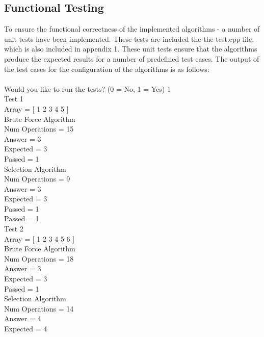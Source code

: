 \documentclass{article}
\newcommand\tab[1][1cm]{\hspace*{#1}}
\begin{document}
    \subsection{Functional Testing}
        To ensure the functional correctness of the implemented algorithms - a number of unit tests have been implemented. These tests are included the the test.cpp file, which is also included in appendix 1. These unit tests ensure that the algorithms produce the expected results for a number of predefined test cases. The output of the test cases for the configuration of the algorithms is as follows:\\\\
        Would you like to run the tests? (0 = No, 1 = Yes)
        1\\
        Test 1\\
        \tab Array = [ 1 2 3 4 5 ]\\
        \tab \tab Brute Force Algorithm\\
        \tab \tab \tab Num Operations = 15\\
        \tab \tab \tab Answer = 3\\
        \tab \tab \tab Expected = 3\\
        \tab \tab \tab Passed = 1\\
        \tab \tab Selection Algorithm\\
        \tab \tab \tab Num Operations = 9\\
        \tab \tab \tab Answer = 3\\
        \tab \tab \tab Expected = 3\\
        \tab \tab \tab Passed = 1\\
        \tab Passed = 1\\
        Test 2\\
        \tab Array = [ 1 2 3 4 5 6 ]\\
        \tab \tab Brute Force Algorithm\\
        \tab \tab \tab Num Operations = 18\\
        \tab \tab \tab Answer = 3\\
        \tab \tab \tab Expected = 3\\
        \tab \tab \tab Passed = 1\\
        \tab \tab Selection Algorithm\\
        \tab \tab \tab Num Operations = 14\\
        \tab \tab \tab Answer = 4\\
        \tab \tab \tab Expected = 4\\
\end{document}
